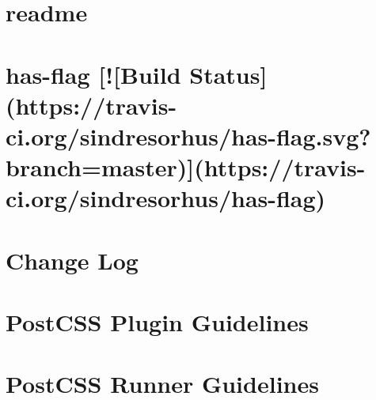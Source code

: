 \documentclass[twoside]{book}
\newcommand{\+}{\discretionary{\mbox{\scriptsize$\hookleftarrow$}}{}{}}
\begin{document}
\chapter{readme}
\label{md__c_1_workspace_demo_src_main_script_node_modules_autoprefixer_node_modules_chalk_readme}

\chapter{has-\/flag \mbox{[}!\mbox{[}Build Status\mbox{]}(https\+://travis-\/ci.org/sindresorhus/has-\/flag.svg?branch=master)\mbox{]}(https\+://travis-\/ci.org/sindresorhus/has-\/flag)}
\label{md__c_1_workspace_demo_src_main_script_node_modules_autoprefixer_node_modules_has-flag_readme}

\chapter{Change Log}
\label{md__c_1_workspace_demo_src_main_script_node_modules_autoprefixer_node_modules_postcss__c_h_a_n_g_e_l_o_g}

\chapter{Post\+C\+SS Plugin Guidelines}
\label{md__c_1_workspace_demo_src_main_script_node_modules_autoprefixer_node_modules_postcss_docs_guidelines_plugin}

\chapter{Post\+C\+SS Runner Guidelines}
\label{md__c_1_workspace_demo_src_main_script_node_modules_autoprefixer_node_modules_postcss_docs_guidelines_runner}

\end{document}
